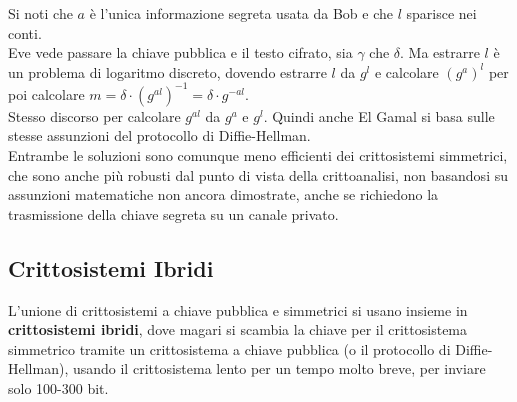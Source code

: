 \documentclass[a4paper,12pt, oneside]{book}
\begin{document}
Si noti che $a$ è l'unica informazione segreta usata da Bob e che $l$ sparisce
nei conti.\\ 
Eve vede passare la chiave pubblica e il testo cifrato, sia $\gamma$ che
$\delta$. Ma estrarre $l$ è un problema di logaritmo discreto, dovendo estrarre
$l$ da $g^l$ e calcolare $(g^a)^l$ per poi calcolare $m=\delta\cdot
(g^{al})^{-1}=\delta\cdot g^{-al}$.\\
Stesso discorso per calcolare $g^{al}$ da $g^a$ e $g^l$. Quindi anche El Gamal
si basa sulle stesse assunzioni del protocollo di Diffie-Hellman.\\
Entrambe le soluzioni sono comunque meno efficienti dei crittosistemi
simmetrici, che sono anche più robusti dal punto di vista della crittoanalisi,
non basandosi su assunzioni matematiche non ancora dimostrate,
anche se richiedono la trasmissione della chiave segreta su un canale privato.
\subsection{Crittosistemi Ibridi}
L'unione di crittosistemi a chiave pubblica e simmetrici si usano insieme in
\textbf{crittosistemi ibridi}, dove magari si scambia la chiave per il
crittosistema simmetrico tramite un crittosistema a chiave pubblica (o il
protocollo di Diffie-Hellman), usando il
crittosistema lento per un tempo molto breve, per inviare solo 100-300 bit.
\end{document}
